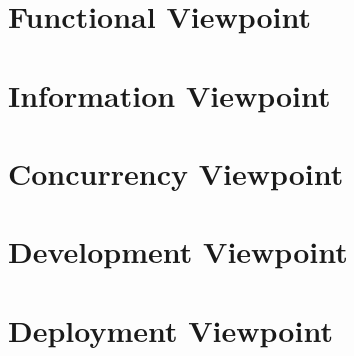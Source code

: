 \documentclass{article}
\begin{document}
\section*{Functional Viewpoint}

\section*{Information Viewpoint}

\section*{Concurrency Viewpoint}

\section*{Development Viewpoint}

\section*{Deployment Viewpoint}
\end{document}
